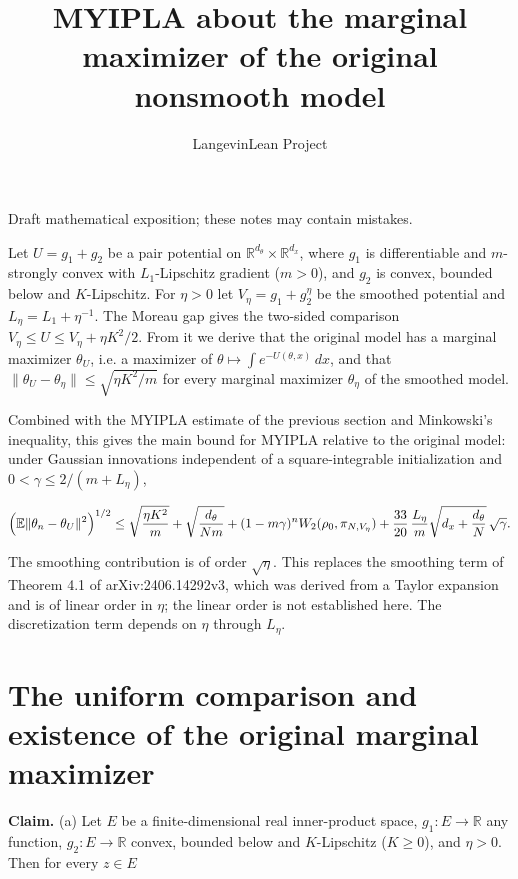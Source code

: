 \documentclass[11pt,a4paper]{article}
\title{\texorpdfstring{MYIPLA about the marginal maximizer of the original nonsmooth model}{MYIPLA about the marginal maximizer of the original nonsmooth model}}
\author{LangevinLean Project}
\date{}
\begin{document}
\maketitle
Draft mathematical exposition; these notes may contain mistakes.


Let \(U=g_1+g_2\) be a pair potential on \(\mathbb R^{d_\theta}\times\mathbb R^{d_x}\), where \(g_1\) is differentiable and \(m\)-strongly convex with \(L_1\)-Lipschitz gradient (\(m>0\)), and \(g_2\) is convex, bounded below and \(K\)-Lipschitz. For \(\eta>0\) let \(V_\eta=g_1+g_2^\eta\) be the smoothed potential and \(L_\eta=L_1+\eta^{-1}\). The Moreau gap gives the two-sided comparison \(V_\eta\le U\le V_\eta+\eta K^2/2\). From it we derive that the original model has a marginal maximizer \(\theta_U\), i.e. a maximizer of \(\theta\mapsto\int e^{-U(\theta,x)}\,dx\), and that \(\|\theta_U-\theta_\eta\|\le\sqrt{\eta K^2/m}\) for every marginal maximizer \(\theta_\eta\) of the smoothed model.




Combined with the MYIPLA estimate of the previous section and Minkowski's inequality, this gives the main bound for MYIPLA relative to the original model: under Gaussian innovations independent of a square-integrable initialization and \(0<\gamma\le2/(m+L_\eta)\),


\[\Bigl(\mathbb E\|\theta_n-\theta_U\|^2\Bigr)^{1/2}\le\sqrt{\frac{\eta K^2}{m}}+\sqrt{\frac{d_\theta}{Nm}}+(1-m\gamma)^nW_2(\rho_0,\pi_{N,V_\eta})+\frac{33}{20}\,\frac{L_\eta}{m}\sqrt{d_x+\frac{d_\theta}N}\,\sqrt\gamma .\]


The smoothing contribution is of order \(\sqrt\eta\). This replaces the smoothing term of Theorem 4.1 of arXiv:2406.14292v3, which was derived from a Taylor expansion and is of linear order in \(\eta\); the linear order is not established here. The discretization term depends on \(\eta\) through \(L_\eta\).


\section{\texorpdfstring{The uniform comparison and existence of the original marginal maximizer}{The uniform comparison and existence of the original marginal maximizer}}


\textbf{Claim.} (a) Let \(E\) be a finite-dimensional real inner-product space, \(g_1:E\to\mathbb R\) any function, \(g_2:E\to\mathbb R\) convex, bounded below and \(K\)-Lipschitz (\(K\ge0\)), and \(\eta>0\). Then for every \(z\in E\)
\end{document}
